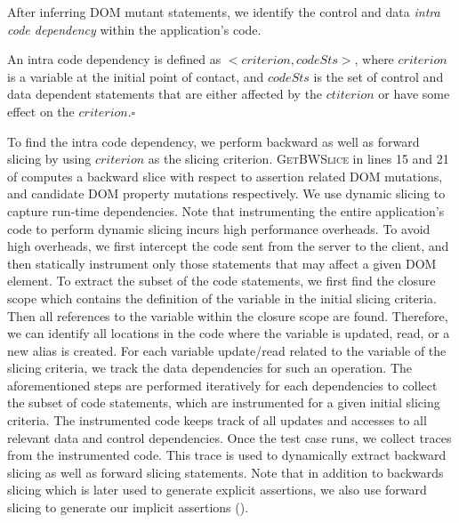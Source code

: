 After inferring DOM mutant statements, we identify the control and data \emph{intra code dependency} within the application's code.
\begin{mydef}
\label{def:intraCodeDep}  
An intra code dependency is defined as $<criterion, codeSts>$, where $criterion$ is a variable at the initial point of contact, and $codeSts$ is the set of control and data dependent statements that are either affected by the $ctiterion$ or have some effect on the $criterion$.$\square$ 
\end{mydef}

To find the intra code dependency, we perform backward as well as forward slicing by using $criterion$ as the slicing criterion.
\textsc{GetBWSlice} in lines  15 and 21 of  computes a backward slice with respect to assertion related DOM mutations, and candidate DOM property mutations respectively.
We use dynamic slicing to capture run-time dependencies.
Note that instrumenting the entire application's code to perform dynamic slicing incurs high performance overheads. To avoid high overheads, we first intercept the code sent from the server to the client, and then statically instrument only those statements that may affect a given DOM element.
To extract the subset of the code statements, we first find the \javascript closure scope which contains the definition of the variable in the initial slicing criteria. Then all references to the variable within the closure scope are found. Therefore, we can identify all locations in the code where the variable is updated, read, or a new alias is created. For each variable update/read related to the variable of the slicing criteria, we track the data dependencies for such an operation. The aforementioned steps are performed iteratively for each dependencies to collect the subset of code statements, which are instrumented for a given initial slicing criteria.
The instrumented code keeps track of all updates and accesses to all relevant data and control dependencies.   
Once the test case runs, we collect traces from the instrumented code. This trace is used to dynamically extract backward slicing as well as forward slicing statements. Note that in addition to backwards slicing which is later used to generate explicit assertions, we also use forward slicing to generate our implicit assertions ().  


